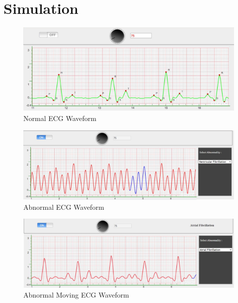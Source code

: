 \documentclass[
  11pt,
  letterpaper,
  DIV=11,
  numbers=noendperiod]{scrreprt}
\begin{document}
\section{Simulation}\label{simulation}

\begin{figure}[H]

{\centering \includegraphics{images/clipboard-2660105563.png}

}

\caption{Normal ECG Waveform}

\end{figure}%
\begin{figure}[H]

{\centering \includegraphics{images/clipboard-2256462463.png}

}

\caption{Abnormal ECG Waveform}

\end{figure}%
\begin{figure}[H]

{\centering \includegraphics{images/clipboard-2993141644.png}

}

\caption{Abnormal Moving ECG Waveform}

\end{figure}%
\end{document}
